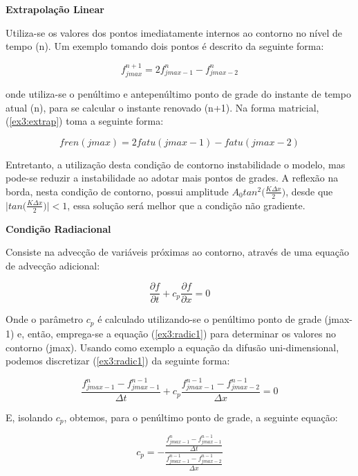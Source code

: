 \documentclass[11pt]{article}
\begin{document}
\textbf{Extrapolação Linear}

Utiliza-se os valores dos pontos imediatamente internos ao contorno no
nível de tempo (n). Um exemplo tomando dois pontos é descrito da
seguinte forma:

\begin{equation}
    f^{n+1}_{jmax} = 2f^{n}_{jmax-1} - f^{n}_{jmax-2}
    \label{ex3:extrap}
\end{equation}

onde utiliza-se o penúltimo e antepenúltimo ponto de grade do instante
de tempo atual (n), para se calcular o instante renovado (n+1). Na forma
matricial, (\ref{ex3:extrap}) toma a seguinte forma:

\begin{equation}
    fren(jmax) = 2fatu(jmax-1) - fatu(jmax-2)
\end{equation}

Entretanto, a utilização desta condição de contorno instabilidade o
modelo, mas pode-se reduzir a instabilidade ao adotar mais pontos de
grades. A reflexão na borda, nesta condição de contorno, possui
amplitude \(A_0tan^2\bigg( \frac{K\Delta{x}}{2} \bigg)\), desde que
\(\bigg| tan\bigg( \frac{K\Delta{x}}{2} \bigg) \bigg| < 1\), essa
solução será melhor que a condição não gradiente.

\textbf{Condição Radiacional}

Consiste na advecção de variáveis próximas ao contorno, através de uma
equação de advecção adicional:

\begin{equation}
    \frac{\partial{f}}{\partial{t}} + c_p\frac{\partial{f}}{\partial{x}} = 0
    \label{ex3:radic1}
\end{equation}

Onde o parâmetro \(c_p\) é calculado utilizando-se o penúltimo ponto de
grade (jmax-1) e, então, emprega-se a equação (\ref{ex3:radic1}) para
determinar os valores no contorno (jmax). Usando como exemplo a equação
da difusão uni-dimensional, podemos discretizar (\ref{ex3:radic1}) da
seguinte forma:

\begin{equation}
    \frac{f^{n}_{jmax-1} - f^{n-1}_{jmax-1}}{\Delta{t}} + c_p\frac{f^{n-1}_{jmax-1} - f^{n-1}_{jmax-2}}{\Delta{x}} = 0
    \label{ex3:radic2}
\end{equation}

E, isolando \(c_p\), obtemos, para o penúltimo ponto de grade, a
seguinte equação:

\begin{equation}
    c_p = -\frac{ \frac{f^{n}_{jmax-1} - f^{n-1}_{jmax-1}}{\Delta{t}} }{ \frac{f^{n-1}_{jmax-1} - f^{n-1}_{jmax-2}}{\Delta{x}} }
    \label{ex3:radic3}
\end{equation}
\end{document}
